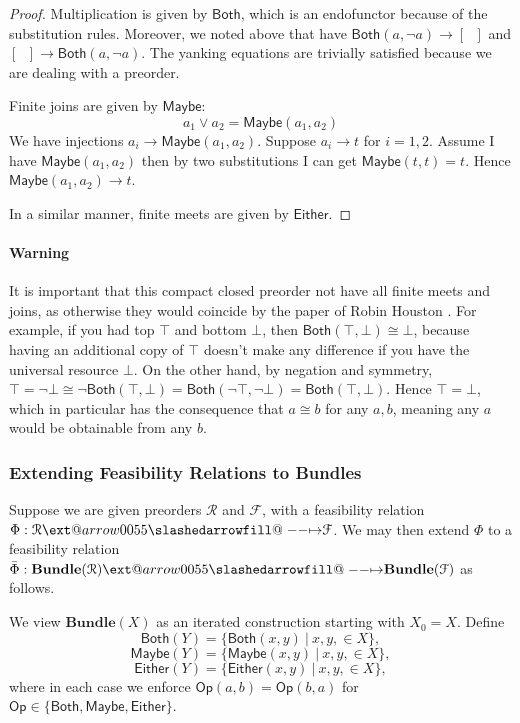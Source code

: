\documentclass[12pt]{article}
\makeatletter
\theoremstyle{definition}
\theoremstyle{plain}
\theoremstyle{plain}
\theoremstyle{plain}
\theoremstyle{plain}
\theoremstyle{remark}
\theoremstyle{remark}
\newcommand{\mc}[1]{\mathcal{#1}}
\newcommand{\maybe}{\mathsf{Maybe}}
\newcommand{\either}{\mathsf{Either}}
\newcommand{\both}{\mathsf{Both}}
\def\slashedarrowfill@#1#2#3#4#5{%
	$\m@th\thickmuskip0mu\medmuskip\thickmuskip\thinmuskip\thickmuskip
	\relax#5#1\mkern-7mu%
	\cleaders\hbox{$#5\mkern-2mu#2\mkern-2mu$}\hfill
	\mathclap{#3}\mathclap{#2}%
	\cleaders\hbox{$#5\mkern-2mu#2\mkern-2mu$}\hfill
	\mkern-7mu#4$%
}
\def\rightslashedarrowfill@{%
	\slashedarrowfill@\relbar\relbar\mapstochar\rightarrow}
\newcommand\xslashedrightarrow[2][]{%
	\ext@arrow 0055{\rightslashedarrowfill@}{#1}{#2}}
\makeatother
\begin{document}
\begin{proof} Multiplication is given by $\mathsf{Both}$, which is an endofunctor because of the substitution rules. Moreover, we noted above that have $\mathsf{Both}(a, \neg a) \rightarrow [ \phantom{n}]$ and $[ \phantom{n}] \rightarrow \mathsf{Both}(a, \neg a)$. The yanking equations are trivially satisfied because we are dealing with a preorder. 

Finite joins are given by $\mathsf{Maybe}$:
\[a_1 \vee a_2 = \mathsf{Maybe}(a_1,a_2)\]
We have injections $a_i \rightarrow \mathsf{Maybe}(a_1,a_2)$. Suppose $a_i \rightarrow t$ for $i=1,2$. Assume I have $\mathsf{Maybe}(a_1,a_2)$ then by two substitutions I can get $\mathsf{Maybe}(t,t) = t$. Hence $\mathsf{Maybe}(a_1,a_2) \rightarrow t$.

In a similar manner, finite meets are given by $\mathsf{Either}$.
\end{proof}

\paragraph{Warning} It is important that this compact closed preorder not have all finite meets and joins, as otherwise they would coincide by the paper of Robin Houston \cite{Houston2006}.  For example, if you had top $\top$ and bottom $\bot$, then $\mathsf{Both}(\top,\bot) \cong \bot$, because having an additional copy of $\top$ doesn't make any difference if you have the universal resource $\bot$. On the other hand, by negation and symmetry, $\top = \neg \bot \cong \neg \mathsf{Both}(\top,\bot) = \mathsf{Both}(\neg \top, \neg \bot) = \mathsf{Both}(\top,\bot)$. Hence $\top = \bot$, which in particular has the consequence that $a \cong b$ for any $a,b$, meaning any $a$ would be obtainable from any $b$. 


\subsubsection{Extending Feasibility Relations to Bundles}
Suppose we are given preorders $\mc{R}$ and $\mc{F}$, with a feasibility relation $\Phi: \mc{R} \xslashedrightarrow{} \mc{F}$. We may then extend $\Phi$ to a feasibility relation $\bar\Phi: \mathbf{Bundle}(\mc{R}) \xslashedrightarrow{} \mathbf{Bundle}(\mc{F})$ as follows.

We view $\mathbf{Bundle}(X)$ as an iterated construction starting with $X_0 = X$. Define 
$$\both(Y) = \{\both(x,y) \: | \: x,y, \in X\},$$
$$\maybe(Y) = \{\maybe(x,y) \: | \: x,y, \in X\},$$
$$\either(Y) = \{\either(x,y) \: | \: x,y, \in X\},$$
where in each case we enforce $\mathsf{Op}(a,b) = \mathsf{Op}(b,a)$ for $\mathsf{Op} \in \{\both, \maybe, \either \}$.
\end{document}
